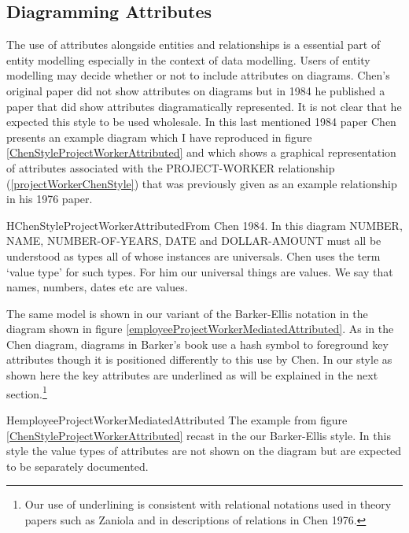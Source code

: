 \subsection*{Diagramming Attributes}
\mynote
The use of attributes alongside entities and relationships is a essential part of entity modelling especially in the context of data modelling. Users of entity modelling may decide whether or not to include attributes on diagrams. Chen's original paper did not show attributes on diagrams  but in 1984
he published a paper that did show attributes diagramatically represented. It is not clear that he expected this style to be used wholesale. 
\mynote
In this last mentioned 1984 paper Chen presents an example diagram 
which I have reproduced in figure  \ref{ChenStyleProjectWorkerAttributed} 
and which shows a graphical representation of attributes associated with the PROJECT-WORKER relationship (\ref{projectWorkerChenStyle}) that was previously given as an example relationship in his 1976 paper.

\begin{erboxedFigure} {H}{ChenStyleProjectWorkerAttributed}{From Chen 1984. In this diagram NUMBER, NAME, NUMBER-OF-YEARS, DATE and DOLLAR-AMOUNT must all be understood as types all of whose instances are universals. Chen uses the term `value type' for such types. For him our universal things are values. We  say that names, numbers, dates etc are values.}

\end{erboxedFigure}

The same model is shown in our variant of the Barker-Ellis notation
 in the diagram shown in figure \ref{employeeProjectWorkerMediatedAttributed}.
As in the Chen diagram, diagrams in Barker's book use a hash symbol to foreground key attributes though it  is positioned differently to this use by Chen. In our style as shown here the key attributes are underlined as will be explained in the next section.\footnote{Our use of underlining is consistent with relational notations used in theory papers such as Zaniola and in descriptions of relations in Chen 1976.}
\begin{erboxedFigure} {H}{employeeProjectWorkerMediatedAttributed}
{The example from figure \ref{ChenStyleProjectWorkerAttributed} recast in the our Barker-Ellis style. 
In this style the value types of attributes are not shown on the diagram but are expected to be 
separately documented. }

\end{erboxedFigure}


 

